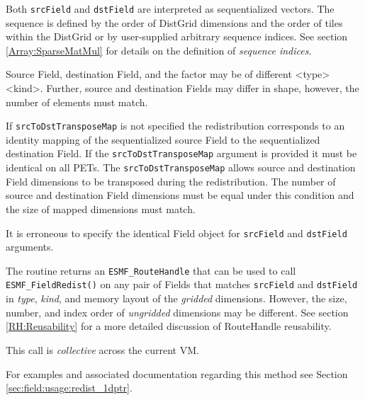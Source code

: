    Both {\tt srcField} and {\tt dstField} are interpreted as sequentialized 
   vectors. The sequence is defined by the order of DistGrid dimensions and the
   order of tiles within the DistGrid or by user-supplied arbitrary sequence
   indices. See section \ref{Array:SparseMatMul} for details on the definition
   of {\em sequence indices}.
  
   Source Field, destination Field, and the factor may be of different
   <type><kind>. Further, source and destination Fields may differ in shape,
   however, the number of elements must match. 
    
   If {\tt srcToDstTransposeMap} is not specified the redistribution corresponds
   to an identity mapping of the sequentialized source Field to the
   sequentialized destination Field. If the {\tt srcToDstTransposeMap}
   argument is provided it must be identical on all PETs. The
   {\tt srcToDstTransposeMap} allows source and destination Field dimensions to
   be transposed during the redistribution. The number of source and destination
   Field dimensions must be equal under this condition and the size of mapped
   dimensions must match.
    
   It is erroneous to specify the identical Field object for {\tt srcField} and
   {\tt dstField} arguments. 
  
     The routine returns an {\tt ESMF\_RouteHandle} that can be used to call 
     {\tt ESMF\_FieldRedist()} on any pair of Fields that matches 
     {\tt srcField} and {\tt dstField} in {\em type}, {\em kind}, and 
     memory layout of the {\em gridded} dimensions. However, the size, number, 
     and index order of {\em ungridded} dimensions may be different. See section
     \ref{RH:Reusability} for a more detailed discussion of RouteHandle 
     reusability.
    
   This call is {\em collective} across the current VM.  
   
   For examples and associated documentation regarding this method see Section
   \ref{sec:field:usage:redist_1dptr}. 
   
